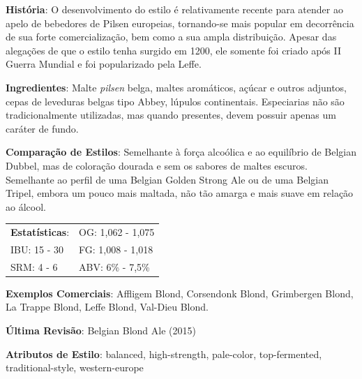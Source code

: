 \textbf{História}: O desenvolvimento do estilo é relativamente recente para atender ao apelo de bebedores de Pilsen europeias, tornando-se mais popular em decorrência de sua forte comercialização, bem como a sua ampla distribuição. Apesar das alegações de que o estilo tenha surgido em 1200, ele somente foi criado após II Guerra Mundial e foi popularizado pela Leffe.

\textbf{Ingredientes}: Malte \textit{pilsen} belga, maltes aromáticos, açúcar e outros adjuntos, cepas de leveduras belgas tipo Abbey, lúpulos continentais. Especiarias não são tradicionalmente utilizadas, mas quando presentes, devem possuir apenas um caráter de fundo.

\textbf{Comparação de Estilos}: Semelhante à força alcoólica e ao equilíbrio de Belgian Dubbel, mas de coloração dourada e sem os sabores de maltes escuros. Semelhante ao perfil de uma Belgian Golden Strong Ale ou de uma Belgian Tripel, embora um pouco mais maltada, não tão amarga e mais suave em relação ao álcool.

\begin{tabular}{@{}p{35mm}p{35mm}@{}}
  \textbf{Estatísticas}: & OG: 1,062 - 1,075 \\
  IBU: 15 - 30  & FG: 1,008 - 1,018  \\
  SRM: 4 - 6  & ABV: 6\% - 7,5\%
\end{tabular}

\textbf{Exemplos Comerciais}: Affligem Blond, Corsendonk Blond, Grimbergen Blond, La Trappe Blond, Leffe Blond, Val-Dieu Blond.

\textbf{Última Revisão}: Belgian Blond Ale (2015)

\textbf{Atributos de Estilo}: balanced, high-strength, pale-color, top-fermented, traditional-style, western-europe
